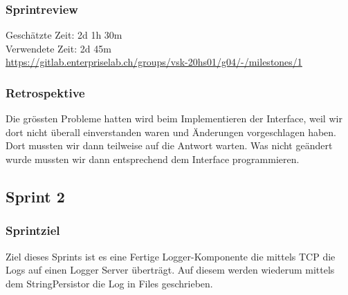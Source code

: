 \subsubsection{Sprintreview}
Geschätzte Zeit: 2d 1h 30m \\
Verwendete Zeit: 2d 45m 
\\
\url{https://gitlab.enterpriselab.ch/groups/vsk-20hs01/g04/-/milestones/1} 
\subsubsection{Retrospektive}
Die grössten Probleme hatten wird beim Implementieren der Interface, weil wir dort nicht überall einverstanden waren und Änderungen vorgeschlagen haben. Dort mussten wir dann teilweise auf die Antwort warten. Was nicht geändert wurde mussten wir dann entsprechend dem Interface programmieren. 
\newpage
\subsection{Sprint 2}
\subsubsection{Sprintziel}
Ziel dieses Sprints ist es eine Fertige Logger-Komponente die mittels TCP die Logs auf einen Logger Server überträgt. Auf diesem werden wiederum mittels dem StringPersistor die Log in Files geschrieben.
